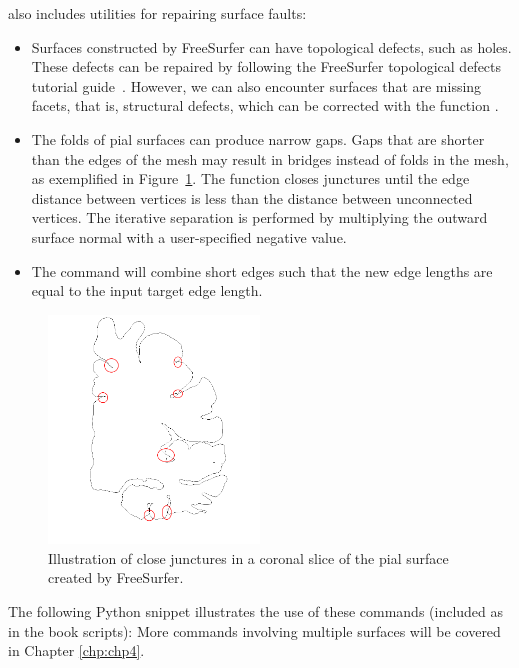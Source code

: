 \svmtk{} also includes utilities for repairing surface faults:
\begin{itemize}
\item
  Surfaces constructed by FreeSurfer can have topological defects,
  such as holes. These defects can be repaired by following the
  FreeSurfer topological defects tutorial guide~\cite{freesurfer-wiki}.
  However, we can also encounter surfaces that are missing facets,
  that is, structural defects, which can be corrected with the \svmtk{}
  function .
\item
  The folds of pial surfaces can produce narrow gaps. Gaps that are
  shorter than the edges of the mesh may result in bridges instead
  of folds in the mesh, as exemplified in
  Figure~\ref{fig:chp3:juncture}. The function
  closes junctures until the edge distance between vertices is less
  than the distance between unconnected vertices. The iterative
  separation is performed by multiplying the outward surface normal
  with a user-specified negative value. 
\item 
  The command  will combine short edges
  such that the new edge lengths are equal to the input target edge
  length.
\end{itemize}
\begin{figure}\sidecaption
  \includegraphics[width=0.5\textwidth]{./graphics/chp3/juncturers-gap.png}
  \caption{Illustration of close junctures in a coronal
    slice of the pial surface created by FreeSurfer.}
  \label{fig:chp3:juncture}
\end{figure}
%
%
The following Python snippet illustrates the use of these commands
(included as  in the
book scripts):
More commands involving multiple surfaces will be
covered in Chapter \ref{chp:chp4}.

